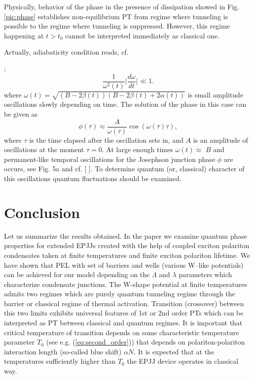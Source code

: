 \documentclass[aps, pre, preprint, groupedaddress, superscriptaddress, showkeys, showpacs] {revtex4-1}
\begin{document}
Physically, behavior of the phase in the presence of dissipation showed in Fig. \ref{pic:phase} establishes non-equilibrium PT from regime where tunneling is possible to the regime where tunneling is suppressed. However, this regime happening at $t>t_0$ cannot be interpreted immediately as classical one.
  
Actually, adiabaticity condition reads, cf. {\cite{Sols}:
%
\begin{equation}
\dfrac{1}{\omega^2(t)} \Big| \dfrac{d \omega}{d t} \Big| \ll 1.
\end{equation}
%
where $\omega(t) = \sqrt{(B - 2\beta(t))(B - 2 \beta(t) + 2 \alpha(t))}$ is small amplitude oscillations slowly depending on time. 
%
%
The solution of the phase in this case can be given as 
\begin{equation}
\phi(\tau) \approx \dfrac{A}{\omega(\tau)} \cos (\omega(\tau) \tau),
\end{equation}
%
where $\tau$ is the time elapsed after the oscillation sets in, and $A$ is an amplitude of oscillations at the moment $\tau = 0$. At large enough times 
$\omega(t) \approx$ $B$  and permanent-like temporal oscillations for the Josephson junction phase $\phi$ are occurs, see Fig. 5a and cf.  [   ]. To determine quantum (or, classical) character of this oscillations quantum fluctuations should be examined.      


\section{Conclusion \label{sec:conclusion}}

Let us summarize the results obtained. In the paper we examine quantum phase properties for  extended EPJJs created with the help of coupled exciton polariton condensates taken at finite temperatures and finite exciton polariton lifetime. We have shown that  PEL with set of barriers and wells (various W--like potentials) can be achieved for our model  depending on the $\Lambda$ and $\lambda$ parameters which characterize condensate junctions. The W-shape potential at finite temperatures admits two regimes which are  purely quantum tunneling regime through the barrier or classical regime of thermal activation.   Transition (crossover) between this two limits exhibits universal features of 1st or 2nd order PTs which can be interpreted as PT between classical and quantum regimes. It is important that critical temperature of transition depends on some  characteristic temperature  parameter $T_{0}$ (see e.g. (\ref{eq:second_order})) that depends on polariton-polariton interaction length (so-called blue shift) $\alpha N$.  It is expected that  at the temperatures sufficiently higher than  $T_{0}$ the EPJJ device operates in classical way. 

}
\end{document}
